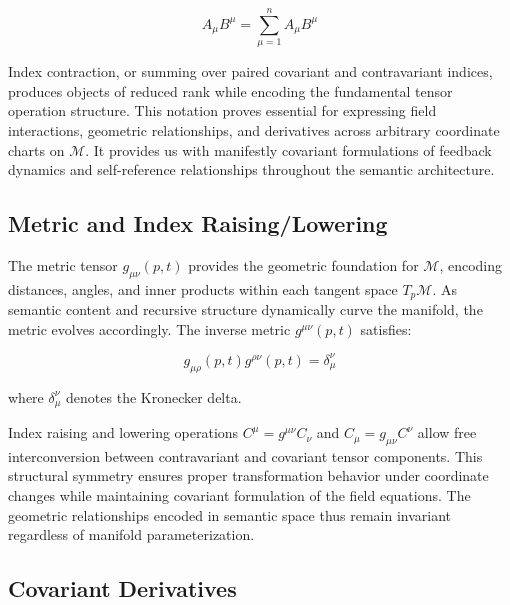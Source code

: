 \begin{equation}
A_\mu B^\mu = \sum_{\mu=1}^n A_\mu B^\mu
\end{equation}

Index contraction, or summing over paired covariant and contravariant indices, produces objects of reduced rank while encoding the fundamental tensor operation structure. This notation proves essential for expressing field interactions, geometric relationships, and derivatives across arbitrary coordinate charts on \(\mathcal{M}\). It provides us with manifestly covariant formulations of feedback dynamics and self-reference relationships throughout the semantic architecture.


\subsection{Metric and Index Raising/Lowering}
\label{2.4.2:metric_and_index_raising_lowering}

The metric tensor \(g_{\mu\nu}(p,t)\) provides the geometric foundation for \(\mathcal{M}\), encoding distances, angles, and inner products within each tangent space \(T_p\mathcal{M}\). As semantic content and recursive structure dynamically curve the manifold, the metric evolves accordingly. The inverse metric \(g^{\mu\nu}(p,t)\) satisfies:

\begin{equation}
g_{\mu\rho}(p,t) g^{\rho\nu}(p,t) = \delta_\mu^\nu
\end{equation}

where \(\delta_\mu^\nu\) denotes the Kronecker delta.

Index raising and lowering operations \(C^\mu = g^{\mu\nu} C_\nu\) and \(C_\mu = g_{\mu\nu} C^\nu\) allow free interconversion between contravariant and covariant tensor components. This structural symmetry ensures proper transformation behavior under coordinate changes while maintaining covariant formulation of the field equations. The geometric relationships encoded in semantic space thus remain invariant regardless of manifold parameterization.


\subsection{Covariant Derivatives}
\label{2.4.3:covariant_derivatives}

